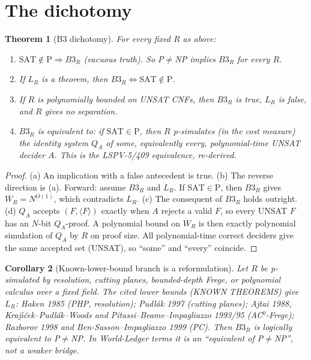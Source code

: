 \documentclass[11pt]{article}
\newtheorem{theorem}{Theorem}
\newtheorem{corollary}[theorem]{Corollary}
\newcommand{\Wb}{\overline W}
\newcommand{\SAT}{\mathrm{SAT}}
\begin{document}
\section{The dichotomy}
\begin{theorem}[B3 dichotomy]\label{thm:dich}
For every fixed $R$ as above:
\begin{enumerate}
\item[(a)] $\SAT\notin\mathrm P\Rightarrow B3_R$ (vacuous truth). So P$\neq$NP implies $B3_R$ for \emph{every} $R$.
\item[(b)] If $L_R$ is a theorem, then $B3_R\iff \SAT\notin\mathrm P$.
\item[(c)] If $R$ is polynomially bounded on UNSAT CNFs, then $B3_R$ is true, $L_R$ is false, and $R$ gives no separation.
\item[(d)] $B3_R$ is equivalent to: if $\SAT\in\mathrm P$, then $R$ p-simulates (in the cost measure) the identity system $Q_A$ of some, equivalently every, polynomial-time UNSAT decider $A$. This is the LSPV-5/409 equivalence, re-derived.
\end{enumerate}
\end{theorem}
\begin{proof}
(a) An implication with a false antecedent is true. (b) The reverse direction is (a).
Forward: assume $B3_R$ and $L_R$. If $\SAT\in\mathrm P$, then $B3_R$ gives
$\Wb_R=N^{O(1)}$, which contradicts $L_R$. (c) The consequent of $B3_R$ holds outright.
(d) $Q_A$ accepts $(F,\langle F\rangle)$ exactly when $A$ rejects a valid $F$, so every
UNSAT $F$ has an $N$-bit $Q_A$-proof. A polynomial bound on $\Wb_R$ is then exactly
polynomial simulation of $Q_A$ by $R$ on proof size. All polynomial-time correct
deciders give the same accepted set (UNSAT), so ``some'' and ``every'' coincide.
\end{proof}

\begin{corollary}[Known-lower-bound branch is a reformulation]\label{cor:weak}
Let $R$ be p-simulated by resolution, cutting planes, bounded-depth Frege, or
polynomial calculus over a fixed field. The cited lower bounds (KNOWN THEOREMS)
give $L_R$: Haken 1985 (PHP, resolution); Pudl\'ak 1997 (cutting planes);
Ajtai 1988, Kraj\'{\i}\v{c}ek--Pudl\'ak--Woods and Pitassi--Beame--Impagliazzo 1993/95 (AC$^0$-Frege);
Razborov 1998 and Ben-Sasson--Impagliazzo 1999 (PC). Then $B3_R$ is
\emph{logically equivalent} to P$\neq$NP. In World-Ledger terms it is an
``equivalent of P$\neq$NP'', not a weaker bridge.
\end{corollary}
\end{document}
